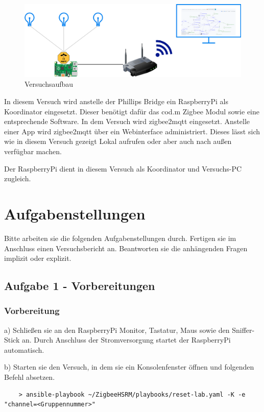 \begin{figure}[H]
    \centering
    \includegraphics[width=1\textwidth]{media/zbz2m.png}
    \caption{Versuchsaufbau}
\end{figure}

In diesem Versuch wird anstelle der Phillips Bridge ein RaspberryPi als Koordinator eingesetzt. Dieser benötigt dafür das cod.m Zigbee Modul sowie eine entsprechende
Software. In dem Versuch wird zigbee2mqtt eingesetzt. Anstelle einer App wird zigbee2mqtt über ein Webinterface administriert. Dieses lässt sich wie in diesem Versuch gezeigt Lokal 
aufrufen oder aber auch nach außen verfügbar machen. 

Der RaspberryPi dient in diesem Versuch als Koordinator und Versuchs-PC zugleich. 

\section{Aufgabenstellungen}

Bitte arbeiten sie die folgenden Aufgabenstellungen durch. Fertigen sie im Anschluss einen Versuchsbericht an. Beantworten sie die anhängenden Fragen
implizit oder explizit.

\subsection{Aufgabe 1 - Vorbereitungen}

\subsubsection{Vorbereitung}
a) Schließen sie an den RaspberryPi Monitor, Tastatur, Maus sowie den Sniffer-Stick an. Durch Anschluss der
Stromversorgung startet der RaspberryPi automatisch. 

b) Starten sie den Versuch, in dem sie ein Konsolenfenster öffnen und folgenden Befehl absetzen.

\begin{lstlisting}
    > ansible-playbook ~/ZigbeeHSRM/playbooks/reset-lab.yaml -K -e "channel=<Gruppennummer>"
\end{lstlisting}


